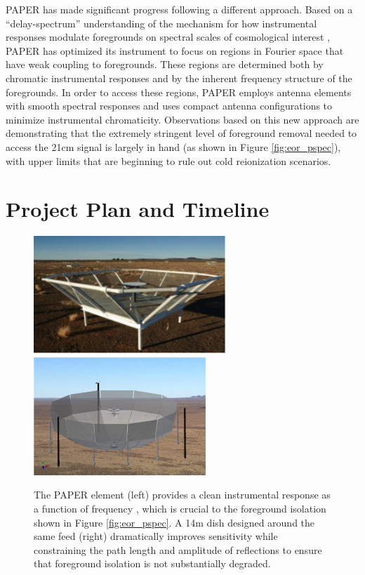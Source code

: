 \documentclass[preprint]{aastex}
\begin{document}
PAPER has made significant progress following a different approach.  Based on a
``delay-spectrum'' understanding of the mechanism for how instrumental
responses modulate foregrounds on spectral scales of cosmological interest
\citep{parsons_et_al2012b}, PAPER has optimized its instrument to focus on
regions in Fourier space that have weak coupling to foregrounds. 
These regions are determined both
by chromatic instrumental responses and by the inherent frequency structure of
the foregrounds.
In order to access these regions, PAPER employs antenna elements with smooth
spectral responses and uses compact antenna configurations to minimize
instrumental chromaticity.
Observations based on
this new approach are demonstrating that the extremely stringent level of
foreground removal needed to access the 21cm signal is largely in hand 
(as shown in Figure \ref{fig:eor_pspec}), with
upper limits that are beginning to rule out cold reionization scenarios. 

\vspace{-0.25in}
\section{Project Plan and Timeline}

\begin{figure}[!ht]\centering
\includegraphics[height=1.75in]{plots/paper_element.jpg}
\includegraphics[height=1.75in]{plots/hera_dish.png}
\caption{\small
The PAPER element (left) provides a clean instrumental response as a function
of frequency \citep{parsons_et_al2010,parsons_et_al2012b}, which is crucial to
the foreground isolation shown in Figure \ref{fig:eor_pspec}.  A 14m dish
designed around the same feed (right) dramatically improves sensitivity while
constraining the path length and amplitude of
reflections to ensure that foreground isolation is not substantially degraded.  
}\label{fig:hera_dish}
\end{figure}
\end{document}
